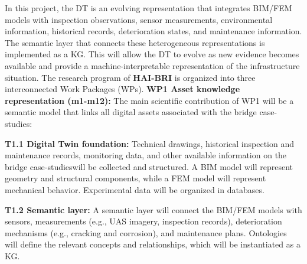 \documentclass[12pt,a4paper]{article}
\newcommand{\projectname}{\textbf{HAI-BRI }} %
\newcommand{\asset}{bridge case-studies}
\begin{document}
%
In this project, the DT is an evolving representation that integrates BIM/FEM models with inspection observations, sensor measurements, environmental information, historical records, deterioration states, and maintenance information. The semantic layer that connects these heterogeneous representations is implemented as a KG. %
This will allow the DT to evolve as new evidence becomes available and provide a machine-interpretable representation of the infrastructure situation. The research program of \projectname is organized into three interconnected Work Packages (WPs). %
%
\textbf{WP1 Asset knowledge representation (m1-m12):} The main scientific contribution of WP1 will be a semantic model that links all digital assets associated with the \asset: \par \vspace{-0.3cm}
%
\textbf{T1.1 Digital Twin foundation:} Technical drawings, historical inspection and maintenance records, monitoring data, and other available information on the \asset will be collected and structured. A BIM model will represent geometry and structural components, while a FEM model will represent mechanical behavior. Experimental data will be organized in databases.\par \vspace{-0.3cm}
%
\textbf{T1.2 Semantic layer:} A semantic layer will connect the BIM/FEM models with sensors, measurements (e.g., UAS imagery, inspection records), deterioration mechanisms (e.g., cracking and corrosion), and maintenance plans. Ontologies will define the relevant concepts and relationships, which will be instantiated as a KG. \par %
\end{document}
